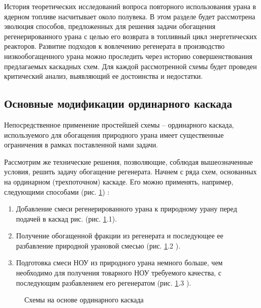 История теоретических исследований вопроса повторного использования урана в ядерном топливе насчитывает около полувека.
В этом разделе будет рассмотрена эволюция способов, предложенных для решения задачи обогащения регенерированного урана с целью его возврата в топливный цикл энергетических реакторов.
Развитие подходов к вовлечению регенерата в производство низкообогащенного урана можно проследить через историю совершенствования предлагаемых каскадных схем.
Для каждой рассмотренной схемы будет проведен критический анализ, выявляющий ее достоинства и недостатки.

\subsection{Основные модификации ординарного каскада}

Непосредственное применение простейшей схемы -- ординарного каскада, используемого для обогащения природного урана имеет существенные ограничения в рамках поставленной нами задачи.

Рассмотрим же технические решения, позволяющие, соблюдая вышеозначенные условия, решить задачу обогащение регенерата. Начнем с ряда схем, основанных на ординарном (трехпоточном) каскаде.
Его можно применять, например, следующими способами (рис. \ref{fig:diagram1}) \cite{smirnovKaskadnyeShemyZadachah2012}:
\begin{enumerate}
  \item Добавление смеси регенерированного урана к природному урану перед подачей в каскад рис. (рис. \ref{fig:diagram1}.1).
  \item Получение обогащенной фракции из регенерата и последующее ее разбавление природной урановой смесью (рис. \ref{fig:diagram1}.2 ).
  \item Подготовка смеси НОУ из природного урана немного больше, чем необходимо для получения товарного НОУ требуемого качества, с последующим разбавлением его регенератом (рис. \ref{fig:diagram1}.3 ).
\end{enumerate}

\begin{figure}[ht]
  \caption{Схемы на основе ординарного каскада}\label{fig:diagram1}
\end{figure}

